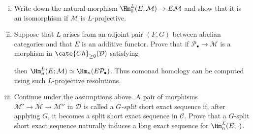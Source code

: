 	\begin{enumerate}[(i)]
		\item Write down the natural morphism
		$\Hm^L_0(E;\mathcal{M})\to E\mathcal{M}$ and show that it is an
		isomorphism if $\mathcal{M}$ is $L$-projective.
		\item Suppose that $L$ arises from an adjoint pair $(F,G)$ between
		abelian categories and that $E$ is an additive functor. Prove that if
		$\mathcal{P}_\bullet\to\mathcal{M}$ is a morphism in
		$\cate{Ch}_{\geq0}(\mathcal{D})$ satisfying
		then
		$\Hm^L_n(E;\mathcal{M})\simeq\Hm_n(E\mathcal{P}_\bullet)$.
		Thus comonad homology can be computed using such $L$-projective
		resolutions.
		\item Continue under the assumptions above. A pair of morphisms
		$\mathcal{M}'\to\mathcal{M}\to\mathcal{M}''$ in $\mathcal{D}$ is
		called a \emph{$G$-split} short exact sequence if, after applying $G$,
		it becomes a split short exact sequence in $\mathcal{C}$. Prove that a
		$G$-split short exact sequence naturally induces a long exact sequence
		for $\Hm^L_n(E;\mathord\cdot)$.
	\end{enumerate}

